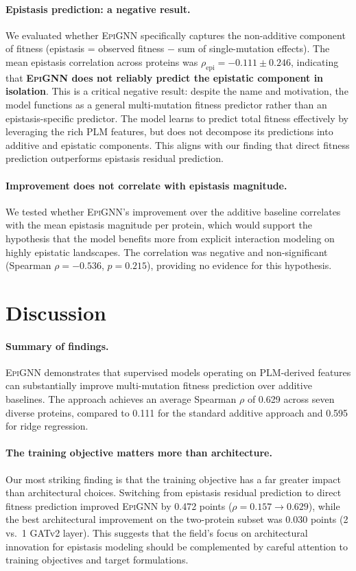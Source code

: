 \documentclass{article}
\newcommand{\epignn}{\textsc{EpiGNN}}
\begin{document}
\paragraph{Epistasis prediction: a negative result.}
We evaluated whether \epignn{} specifically captures the non-additive component of fitness (epistasis = observed fitness $-$ sum of single-mutation effects).
The mean epistasis correlation across proteins was $\rho_{\text{epi}} = -0.111 \pm 0.246$, indicating that \textbf{\epignn{} does not reliably predict the epistatic component in isolation}.
This is a critical negative result: despite the name and motivation, the model functions as a general multi-mutation fitness predictor rather than an epistasis-specific predictor.
The model learns to predict total fitness effectively by leveraging the rich PLM features, but does not decompose its predictions into additive and epistatic components.
This aligns with our finding that direct fitness prediction outperforms epistasis residual prediction.

\paragraph{Improvement does not correlate with epistasis magnitude.}
We tested whether \epignn{}'s improvement over the additive baseline correlates with the mean epistasis magnitude per protein, which would support the hypothesis that the model benefits more from explicit interaction modeling on highly epistatic landscapes.
The correlation was negative and non-significant (Spearman $\rho = -0.536$, $p = 0.215$), providing no evidence for this hypothesis.

\section{Discussion}
\label{sec:discussion}

\paragraph{Summary of findings.}
\epignn{} demonstrates that supervised models operating on PLM-derived features can substantially improve multi-mutation fitness prediction over additive baselines.
The approach achieves an average Spearman $\rho$ of 0.629 across seven diverse proteins, compared to 0.111 for the standard additive approach and 0.595 for ridge regression.

\paragraph{The training objective matters more than architecture.}
Our most striking finding is that the training objective has a far greater impact than architectural choices.
Switching from epistasis residual prediction to direct fitness prediction improved \epignn{} by 0.472 points ($\rho = 0.157 \to 0.629$), while the best architectural improvement on the two-protein subset was 0.030 points (2 vs.\ 1 GATv2 layer).
This suggests that the field's focus on architectural innovation for epistasis modeling should be complemented by careful attention to training objectives and target formulations.
\end{document}
